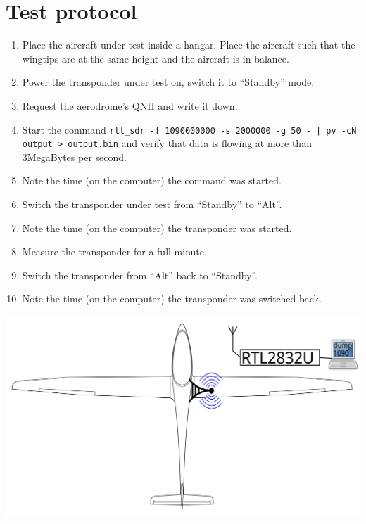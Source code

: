 \documentclass[a4paper]{article}
\begin{document}
\section{Test protocol}

\begin{enumerate}
\item Place the aircraft under test inside a hangar. Place the aircraft such that the wingtips are at the same height and the aircraft is in balance.
\item Power the transponder under test on, switch it to ``Standby'' mode.
\item Request the aerodrome's QNH and write it down.
\item Start the command \texttt{{rtl\_sdr -f 1090000000 -s 2000000 -g 50 - | pv -cN output > output.bin}} and verify that data is flowing at more than 3MegaBytes per second.
\item Note the time (on the computer) the command was started.
\item Switch the transponder under test from ``Standby'' to ``Alt''.
\item Note the time (on the computer) the transponder was started.
\item Measure the transponder for a full minute.
\item Switch the transponder from ``Alt'' back to ``Standby''.
\item Note the time (on the computer) the transponder was switched back.
\end{enumerate}

\includegraphics[width=\textwidth]{setup}



\end{document}
